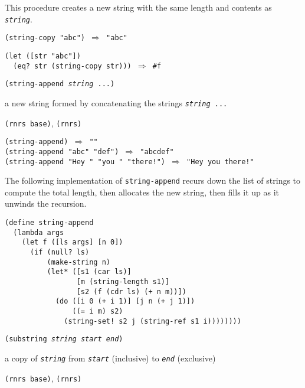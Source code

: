This procedure creates a new string with the same length and
contents as \texttt{\textit{string}}.


\begin{alltt}
(string-copy "abc") \(\Rightarrow\) "abc"

(let ([str "abc"])
  (eq? str (string-copy str))) \(\Rightarrow\) \#{}f
\end{alltt}

\begin{description}

\label{objects_s223}\item[procedure] \texttt{(string-append \textit{string} ...)}



\item[returns] a new string formed by concatenating the strings \texttt{\textit{string} ...}


\item[libraries] \texttt{(rnrs base)}, \texttt{(rnrs)}
\end{description}


\begin{alltt}
(string-append) \(\Rightarrow\) ""
(string-append "abc" "def") \(\Rightarrow\) "abcdef"
(string-append "Hey " "you " "there!") \(\Rightarrow\) "Hey you there!"
\end{alltt}


The following implementation of \texttt{string-append} recurs down the
list of strings to compute the total length, then allocates the new
string, then fills it up as it unwinds the recursion.


\begin{alltt}
(define string-append
  (lambda args
    (let f ([ls args] [n 0])
      (if (null? ls)
          (make-string n)
          (let* ([s1 (car ls)]
                 [m (string-length s1)]
                 [s2 (f (cdr ls) (+ n m))])
            (do ([i 0 (+ i 1)] [j n (+ j 1)])
                ((= i m) s2)
              (string-set! s2 j (string-ref s1 i))))))))
\end{alltt}

\begin{description}

\label{objects_s224}\item[procedure] \texttt{(substring \textit{string} \textit{start} \textit{end})}



\item[returns] a copy of \texttt{\textit{string}} from \texttt{\textit{start}} (inclusive) to \texttt{\textit{end}}
  (exclusive)


\item[libraries] \texttt{(rnrs base)}, \texttt{(rnrs)}
\end{description}


